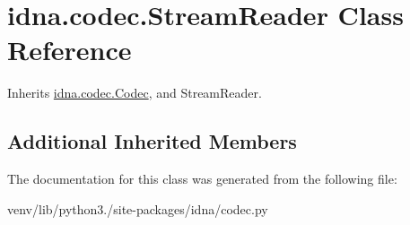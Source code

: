 \hypertarget{classidna_1_1codec_1_1_stream_reader}{}\section{idna.\+codec.\+Stream\+Reader Class Reference}
\label{classidna_1_1codec_1_1_stream_reader}


Inherits \hyperlink{classidna_1_1codec_1_1_codec}{idna.\+codec.\+Codec}, and Stream\+Reader.

\subsection*{Additional Inherited Members}


The documentation for this class was generated from the following file\+:\begin{DoxyCompactItemize}
\item 
venv/lib/python3./site-\/packages/idna/codec.\+py\end{DoxyCompactItemize}
